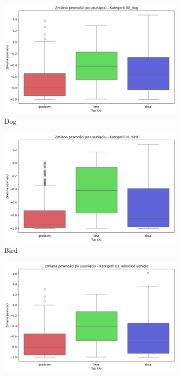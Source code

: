 \begin{figure}
	\centering
	\begin{subfigure}[b]{0.3\textwidth}
		\includegraphics[width=.9\textwidth]{img/base_confidence_no_exp_dog}
		\caption{Dog}  \label{rys:base_confidence_no_exp_dog}
	\end{subfigure}
	\begin{subfigure}[b]{0.3\textwidth}
		\centering\includegraphics[width=.9\textwidth]{img/base_confidence_no_exp_bird}
		\caption{Bird}  \label{rys:base_confidence_no_exp_bird}
	\end{subfigure}
	\begin{subfigure}[b]{0.3\textwidth}
		\centering\includegraphics[width=.9\textwidth]{img/base_confidence_no_exp_vehicle}

\end{subfigure}
\end{figure}
